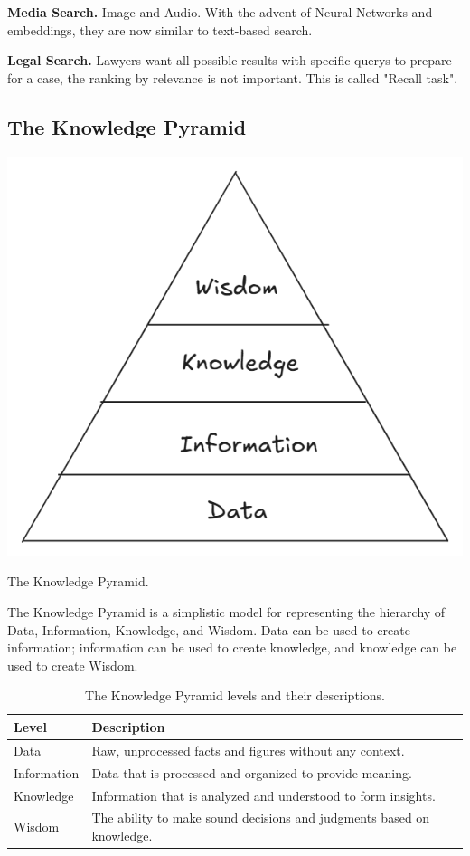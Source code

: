 \documentclass[a4paper]{tufte-handout}
\begin{document}
\textbf{Media Search.} Image and Audio. With the advent of Neural Networks and embeddings, they are now similar to text-based search.

\textbf{Legal Search.} Lawyers want all possible results with specific querys to prepare for a case, the ranking by relevance is not important. This is called "Recall task".


\subsection{The Knowledge Pyramid}

\begin{marginfigure}
	\includegraphics[width=\linewidth]{dikw-pyramid.png}
	\caption{The Knowledge Pyramid.}
	\label{fig:dikw}
\end{marginfigure}

The Knowledge Pyramid is a simplistic model for representing the hierarchy of Data, Information, Knowledge, and Wisdom. Data can be used to create information; information can be used to create knowledge, and knowledge can be used to create Wisdom.

\begin{table}[ht]
	\centering
	\selectfont
	\renewcommand{\arraystretch}{1.5} %
	\begin{tabular}{l p{6cm}}
		\toprule
		Level & Description \\
		\midrule
		Data & Raw, unprocessed facts and figures without any context. \\
		Information & Data that is processed and organized to provide meaning. \\
		Knowledge & Information that is analyzed and understood to form insights. \\
		Wisdom & The ability to make sound decisions and judgments based on knowledge.\\
		\bottomrule
	\end{tabular}
	\caption{The Knowledge Pyramid levels and their descriptions.}
	\label{tab:knowledge-pyramid}
\end{table}
\end{document}

